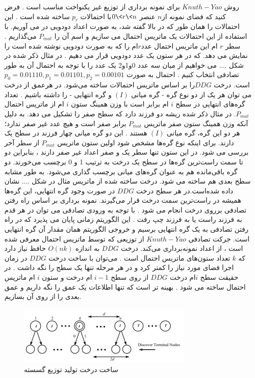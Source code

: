 روش $Knuth-Yao$ برای نمونه برداری از توزیع غیر یکنواخت مناسب است . فرض کنید که فضای نمونه از$ n$  عنصر $0\< r \< n$با احتمالات  $p_{r}$ ساخته شده است . این احتمالات را همان طور که در بالا گفته شد، به صورت اعداد دودویی در می آوریم.   با استفاده از این احتمالات یک ماتریس احتمال می سازیم و اسم آن را $P_{mat}$  می‌گذاریم . سطر $ r$ ام این ماتریس احتمال عدد$ r $ام را که به صورت دودویی نوشته شده است را  نمایش می دهد. که در هر ستون یک عدد دودویی قرار می دهیم .  در مثال ذکر شده در شکل .... می خواهیم از میان سه عدد 0و1و2  یک عدد را با توجه به احتمال آن به طور تصادفی انتخاب کنیم . احتمال به صورت $p_{0}= 0.01110, p_{1} = 0.01101, p_{2} = 0.00101$ است. 
درخت $DDG $را  بر اساس ماتریس احتمالات ساخته می‌شود. در هرعمق از درخت می توان  هر یک از دو نوع گره - گره میانی $(I)$ و گره انتهایی - را داشته باشیم . تعداد گره‌های انتهایی در سطح $i$ ام برابر است با وزن همینگ ستون $i$ ام از ماتریس احتمال $P_{mat}$.  در مثال ذکر شده ریشه دو فرزند دارد که سطح صفر را تشکیل می دهد. به دلیل آنکه وزن همینگ ستون صفر ماتریس $P_{mat}$ برابر صفر است و هیچ عدد غیر صفر ندارد؛ هر دو این گره، گره میانی    $(I)$  هستند . این دو گره میانی چهار فرزند در سطح یک دارند. برای اینکه نوع گره‌ها مشخص شود اولین ستون ماتریس $P_{mat}$ از سطر آخر بررسی می شود. در این ستون تنها سطر یک و صفر اعداد غیر صفر دارند ، بنابراین  دو تا سمت راست‌ترین گره‌ها در سطح یک درخت به ترتیب  1 و 0 برچسب می‌خورند. دو گره باقی‌مانده هم به عنوان گره‌های میانی برچسب گذاری می‌شود. به طور مشابه سطح بعدی هم ساخته می شود. درخت ساخته شده از ماتریس مثال در شکل .... نشان داده شده‌است.در هر سطح درخت $DDG$ در صورت وجود گره انتهایی، این گره‌ها همیشه در راست‌ترین سمت درخت قرار می‌گیرند.
 نمونه برداری بر اساس راه رفتن تصادفی برروی درخت انجام می شود . با توجه به ورودی تصادفی  می توان در هر قدم به فرزند راست یا به فرزند چپ رفت . این الگوریتم زمانی پایان می پذیرد که در راه رفتن تصادفی به یک گره انتهایی برسیم و خروجی الگوریتم همان مقدار آن گره انتهایی است. جرکت تصادفی $Knuth-Yao$ از توزیعی که توسط ماتریس احتمال معرفی شده است ، از اعداد نمونه‌برداری می‌کند.
درخت $DDG$ به اندازه $O(nk)$ حافظ  نیاز دارد که $k $ تعداد ستون‌های ماتریس احتمال است . می‌توان با ساخت درخت $DDG$ در زمان اجرا فضای مورد نیاز را کمتر کرد و در هر مرحله تنها یک سطح را نگه داشت . در حقیقت سطح $i $ام   درخت $DDG$ از روی سطح $i-1$   ام درخت و ستون $i$ ام ماتریس احتمال ساخته می شود . بهینه تر است که تنها اطلاعات یک عمق را نگه داریم و عمق بعدی را از روی آن بسازیم. 



      \begin{figure}[!htb]
      	\includegraphics[width=\linewidth]{images/Knuth-Yao-ilevel}
      	\caption{ساخت درخت تولید توزیع گسسته}\label{fig:logtonemap}
      	\endminipage\hfill
      \end{figure}
